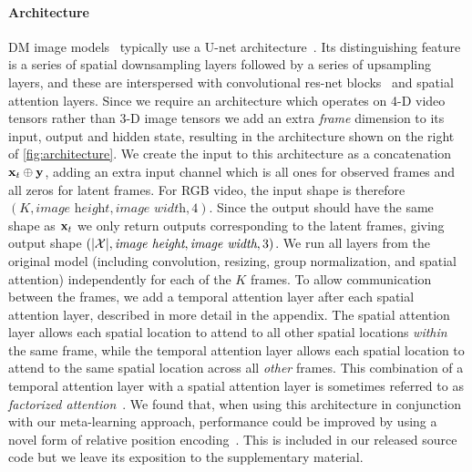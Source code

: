 \paragraph{Architecture}
\label{sec:architecture}
DM image models~\citep{ho2020denoising,nichol2021improved} typically use a U-net architecture~\cite{ronneberger2015u}. Its distinguishing feature is a series of spatial downsampling layers followed by a series of upsampling layers, and these are interspersed with convolutional res-net blocks~\cite{he2015deep} and spatial attention layers. Since we require an architecture which operates on 4-D video tensors rather than 3-D image tensors we add an extra \textit{frame} dimension to its input, output and hidden state, resulting in the architecture shown on the right of \cref{fig:architecture}. We create the input to this architecture as a concatenation ${\mathbf{x}}_t \oplus {\mathbf{y}}$, adding an extra input channel which is all ones for observed frames and all zeros for latent frames. For RGB video, the input shape is therefore $(K, \textit{image height}, \textit{image width}, 4)$. Since the output should have the same shape as ${\mathbf{x}}_t$ we only return outputs corresponding to the latent frames, giving output shape  $(|\mathcal{X}|, \textit{image height}, \textit{image width}, 3)$. We run all layers from the original model (including convolution, resizing, group normalization, and spatial attention) independently for each of the $K$ frames.
To allow communication between the frames, we add a temporal attention layer after each spatial attention layer, described in more detail in the appendix. 
%
The spatial attention layer allows each spatial location to attend to all other spatial locations \textit{within} the same frame, while the temporal attention layer allows each spatial location to attend to the same spatial location across all \textit{other} frames.
%
This combination of a temporal attention layer with a spatial attention layer is sometimes referred to as \textit{factorized attention}~\citep{tashiro2021csdi,ho2022video}. We found that, when using this architecture in conjunction with our meta-learning approach, performance could be improved by using a novel form of relative position encoding~\cite{shaw2018self,wu2021rethinking}. This is included in our released source code but we leave its exposition to the supplementary material.

